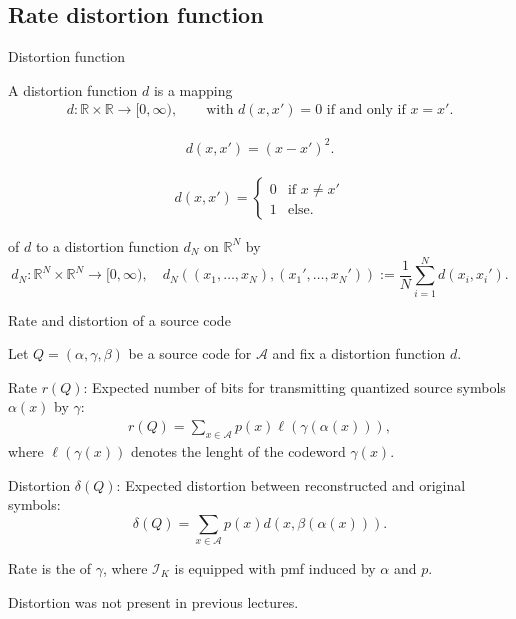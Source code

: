 \subsection{Rate distortion function}
\begin{frame}{Distortion function}
\bit
\item A distortion function $d$ is a mapping
\begin{align*}
d: \mathbb{R}\times\mathbb{R}\to [0,\infty), \qquad \text {with $d(x,x')=0$ if and only if $x=x'$}.
\end{align*}
\item {} 
\begin{align*}
d(x,x')=(x-x')^2.
\end{align*}
\item {}
\begin{align*}
d(x,x')=\begin{cases} 0 & \text{if $x\neq x'$} \\ 1 & \text{else.}  \end{cases}
\end{align*}
\item {} of $d$ to a distortion function $d_N$ on $\mathbb{R}^N$ by   
\[
d_N:\mathbb{R}^N\times\mathbb{R}^N\to [0,\infty),\quad d_N((x_1,\dots,x_N),(x_1',\dots,x_N')):=\frac{1}{N}\sum_{i=1}^Nd(x_i,x_i'). 
\]
\eit 
\end{frame}

\begin{frame}{Rate and distortion of a source code}
\begin{definition}
Let $Q=(\alpha,\gamma,\beta)$ be a source code for $\mathcal{A}$ 
and fix a distortion function $d$. 
\bit
\item Rate $r(Q)$: Expected number of bits for transmitting 
quantized source symbols $\alpha(x)$ 
by $\gamma$:  
\begin{align*}
r(Q)=\sum_{x\in\mathcal{A}}p(x)\ell(\gamma(\alpha(x))),
\end{align*}
where $\ell(\gamma(x))$ denotes the lenght of the codeword $\gamma(x)$. 
\item Distortion $\delta(Q)$: Expected distortion between reconstructed and original symbols:
\[
\delta(Q)=\sum_{x\in\mathcal{A}}p(x)d(x,\beta(\alpha(x))). 
\]
\eit 
\end{definition}
\bit
\item Rate is the  of $\gamma$, where $\mathcal{I}_K$ is equipped with pmf induced by $\alpha$ and $p$. 
\item Distortion was not present in previous lectures.
\eit  
\end{frame}


